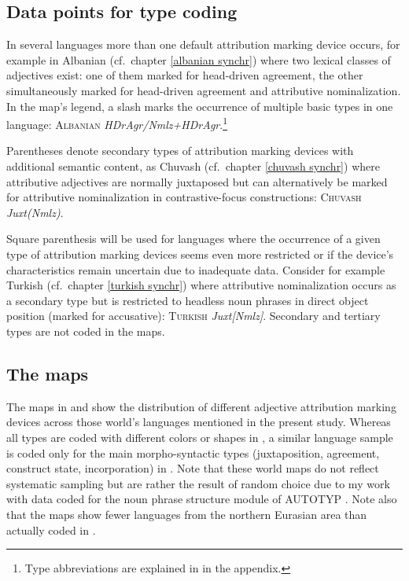 \subsection[Type coding]{Data points for type coding}
In several languages more than one default attribution marking device occurs, for example in Albanian (cf.~chapter \ref{albanian synchr}) where two lexical classes of adjectives exist: one of them marked for head-driven agreement, the other simultaneously marked for head-driven agreement and attributive nominalization. In the map's legend, a slash marks the occurrence of multiple basic types in one language: \textsc{Albanian} \textit{HDrAgr/Nmlz+HDrAgr}.\footnote{Type abbreviations are explained in  in the appendix.}

Parentheses denote secondary types of attribution marking devices with additional semantic content, as Chuvash (cf.~chapter \ref{chuvash synchr}) where attributive adjectives are normally juxtaposed but can alternatively be marked for attributive nominalization in contrastive-focus constructions: \textsc{Chuvash} \textit{Juxt(Nmlz)}.

Square parenthesis will be used for languages where the occurrence of a given type of attribution marking devices seems even more restricted or if the device's characteristics remain uncertain due to inadequate data. Consider for example Turkish (cf.~chapter \ref{turkish synchr}) where attributive nominalization occurs as a secondary type but is restricted to headless noun phrases in direct object position (marked for accusative): \textsc{Turkish} \textit{Juxt[Nmlz]}. 
Secondary and tertiary types are not coded in the maps. 

\subsection{The maps}
The maps in  and  show the distribution of different adjective attribution marking devices across those world's languages mentioned in the present study. Whereas all types are coded with different colors or shapes in , a similar language sample is coded only for the main morpho-syntactic types (juxtaposition, agreement, construct state, incorporation) in . Note that these world maps do not reflect systematic sampling but are rather the result of random choice due to my work with data coded for the noun phrase structure module of AUTOTYP \citep{AUTOTYP-NP}. Note also that the maps show fewer languages from the northern Eurasian area than actually coded in .

